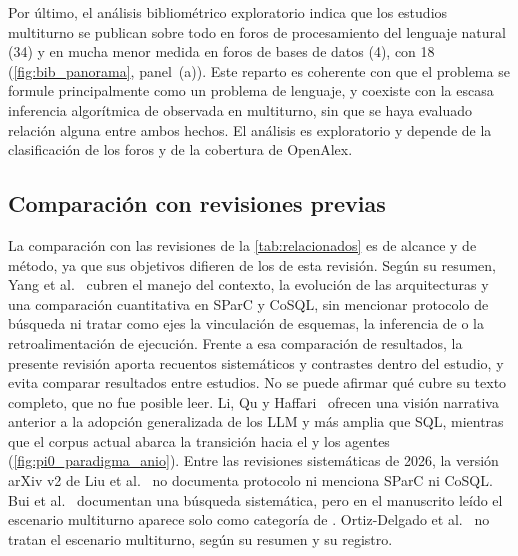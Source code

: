 Por último, el análisis bibliométrico exploratorio indica que los estudios multiturno se publican sobre todo en foros de procesamiento del lenguaje natural (34) y en mucha menor medida en foros de bases de datos (4), con 18  (\cref{fig:bib_panorama}, panel~(a)). Este reparto es coherente con que el problema se formule principalmente como un problema de lenguaje, y coexiste con la escasa inferencia algorítmica de  observada en multiturno, sin que se haya evaluado relación alguna entre ambos hechos. El análisis es exploratorio y depende de la clasificación de los foros y de la cobertura de OpenAlex.

\subsection{Comparación con revisiones previas}
\label{sec:dis-comparacion}

La comparación con las revisiones de la \cref{tab:relacionados} es de alcance y de método, ya que sus objetivos difieren de los de esta revisión. Según su resumen, Yang et al.~\cite{Yang2025Conversational} cubren el manejo del contexto, la evolución de las arquitecturas y una comparación cuantitativa en SParC y CoSQL, sin mencionar protocolo de búsqueda ni tratar como ejes la vinculación de esquemas, la inferencia de  o la retroalimentación de ejecución. Frente a esa comparación de resultados, la presente revisión aporta recuentos sistemáticos y contrastes dentro del estudio, y evita comparar resultados entre estudios. No se puede afirmar qué cubre su texto completo, que no fue posible leer. Li, Qu y Haffari~\cite{Li2020ContextSurvey} ofrecen una visión narrativa anterior a la adopción generalizada de los LLM y más amplia que SQL, mientras que el corpus actual abarca la transición hacia el  y los agentes (\cref{fig:pi0_paradigma_anio}). Entre las revisiones sistemáticas de 2026, la versión arXiv v2 de Liu et al.~\cite{Liu2026NLIDBReview} no documenta protocolo ni menciona SParC ni CoSQL. Bui et al.~\cite{Bui2026Survey} documentan una búsqueda sistemática, pero en el manuscrito leído el escenario multiturno aparece solo como categoría de . Ortiz-Delgado et al.~\cite{OrtizDelgado2026RAG} no tratan el escenario multiturno, según su resumen y su registro.

